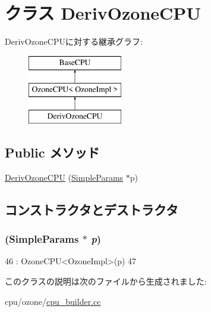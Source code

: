 \hypertarget{classDerivOzoneCPU}{
\section{クラス DerivOzoneCPU}
\label{classDerivOzoneCPU}
}
DerivOzoneCPUに対する継承グラフ:\begin{figure}[H]
\begin{center}
\leavevmode
\includegraphics[height=3cm]{classDerivOzoneCPU}
\end{center}
\end{figure}
\subsection*{Public メソッド}
\begin{DoxyCompactItemize}
\item 
\hyperlink{classDerivOzoneCPU_ae6076f05cb70ff5f9ed24fff50d5b528}{DerivOzoneCPU} (\hyperlink{classSimpleParams}{SimpleParams} $\ast$p)
\end{DoxyCompactItemize}


\subsection{コンストラクタとデストラクタ}
\hypertarget{classDerivOzoneCPU_ae6076f05cb70ff5f9ed24fff50d5b528}{
\subsubsection[{DerivOzoneCPU}]{ ({\bf SimpleParams} $\ast$ {\em p})}}
\label{classDerivOzoneCPU_ae6076f05cb70ff5f9ed24fff50d5b528}



\begin{DoxyCode}
46         : OzoneCPU<OzoneImpl>(p)
47     { }
\end{DoxyCode}


このクラスの説明は次のファイルから生成されました:\begin{DoxyCompactItemize}
\item 
cpu/ozone/\hyperlink{cpu__builder_8cc}{cpu\_\-builder.cc}\end{DoxyCompactItemize}
